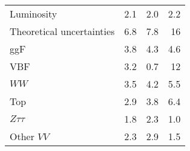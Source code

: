 \begin{table}[htb]
{\begin{tabular}{lrrr}
      \hspace*{4mm} Luminosity            & 2.1                                                                                                                          & 2.0                                                                                                                  & 2.2\tabularnewline
      Theoretical uncertainties           & 6.8                                                                                                                          & 7.8                                                                                                                  & 16\phantom{.0} \tabularnewline
      \hspace*{4mm} ggF                   & 3.8                                                                                                                          & 4.3                                                                                                                  & 4.6\tabularnewline
      \hspace*{4mm} VBF                   & 3.2                                                                                                                          & 0.7                                                                                                                  & 12\phantom{.0}\tabularnewline
      \hspace*{4mm} $WW$                  & 3.5                                                                                                                          & 4.2                                                                                                                  & 5.5\tabularnewline
      \hspace*{4mm} Top                   & 2.9                                                                                                                          & 3.8                                                                                                                  & 6.4\tabularnewline
      \hspace*{4mm} $Z\tau\tau$           & 1.8                                                                                                                          & 2.3                                                                                                                  & 1.0\tabularnewline
      \hspace*{4mm} Other $VV$            & 2.3                                                                                                                          & 2.9                                                                                                                  & 1.5\tabularnewline

\end{tabular}}
\end{table}
